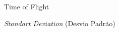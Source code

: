 \begin{siglas}
  \item[TOF] Time of Flight
  \item[SD] \textit{Standart Deviation} (Desvio Padrão)
\end{siglas}
